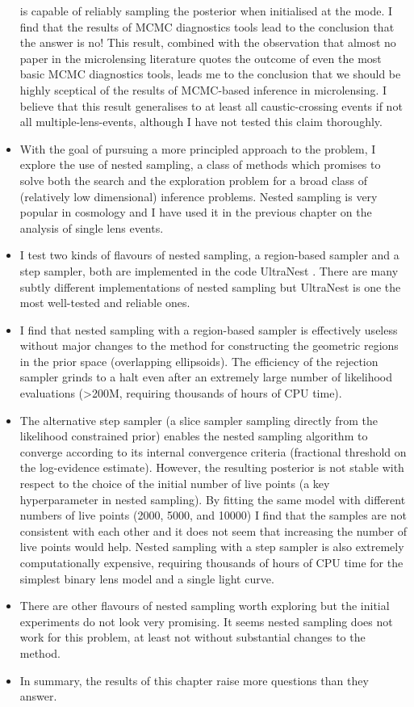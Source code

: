 \documentclass[12pt,dvipsnames]{report}
\newcommand{\ssf}[1]{\textsf{#1}}
\begin{document}
\begin{itemize}
is capable of reliably sampling the posterior when initialised at the mode. I find that 
the results of MCMC diagnostics tools lead to the conclusion that the answer is no! This result, combined
with the observation that almost no paper in the microlensing literature quotes the outcome
of even the most basic MCMC diagnostics tools, leads me to the conclusion that we should be 
highly sceptical of the results of MCMC-based inference in microlensing. I believe that this 
result generalises to at least all caustic-crossing events if not all multiple-lens-events, 
although I have not tested this claim thoroughly.
\item With the goal of pursuing a more principled approach to the problem, I explore 
the use of nested sampling, a class of methods which promises to solve both the search 
and the exploration problem for a broad class of (relatively low dimensional) inference 
problems. Nested sampling is very popular in cosmology and I have used it in the previous 
chapter on the analysis of single lens events.
\item I test two kinds of flavours of nested sampling, a region-based sampler and 
a step sampler, both are implemented in the code \ssf{UltraNest} \citet{2021JOSS....6.3001B}.
There are many subtly different implementations of nested sampling but \ssf{UltraNest}
is one the most well-tested and reliable ones. 
\item I find that nested sampling with a region-based sampler is effectively useless
without major changes to the method for constructing the geometric regions in the prior space
(overlapping ellipsoids). The efficiency of the rejection sampler 
grinds to a halt even after an extremely large number of likelihood evaluations (>200M, 
requiring thousands of hours of CPU time).
\item The alternative step sampler (a slice sampler sampling directly from the likelihood 
constrained prior) enables the nested sampling algorithm to converge according to its 
internal convergence criteria (fractional threshold on the log-evidence estimate). 
However, the resulting posterior is not stable with respect to the choice of the initial
number of live points (a key hyperparameter in nested sampling). By fitting the same model 
with different numbers of live points (2000, 5000, and 10000) I find that the samples 
are not consistent with each other and it does not seem that increasing the number 
of live points would help. Nested sampling with a step sampler is also extremely computationally 
expensive, requiring thousands of hours of CPU time for the simplest binary lens model 
and a single light curve.
\item There are other flavours of nested sampling worth exploring but the initial experiments 
do not look very promising. It seems nested sampling does not work for this problem, at least
not without substantial changes to the method.
\item In summary, the results of this chapter raise more questions than they answer.
\end{itemize}
\end{document}
